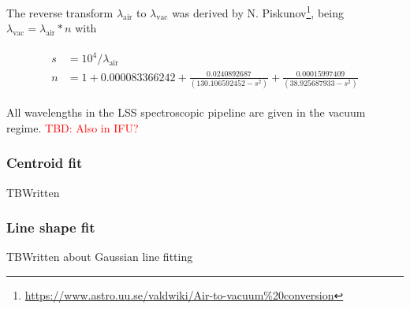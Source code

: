 The reverse transform $\lambda_\textrm{air}$ to $\lambda_\textrm{vac}$ was derived by N. Piskunov\footnote{\url{https://www.astro.uu.se/valdwiki/Air-to-vacuum\%20conversion}}, being $\lambda_\textrm{vac}=\lambda_\textrm{air}*n$ with 

\begin{eqnarray}\label{eq:vac2air}
\left.\begin{aligned}
    s&=10^4 / \lambda_{\textrm{air}}\\
    n&=1 + 0.000083366242 + \frac{0.0240892687}{(130.106592452 - s^2)} + \frac{0.00015997409}{(38.925687933 - s^2)}
\end{aligned}\right.
\end{eqnarray}

All wavelengths in the \ac{LSS} spectroscopic pipeline are given in the vacuum regime. \textcolor{red}{TBD: Also in IFU?}

\subsubsection{Centroid fit}
\label{sssec:centroid}
TBWritten

\subsubsection{Line shape fit}
\label{sssec:linefit}
TBWritten about Gaussian line fitting


